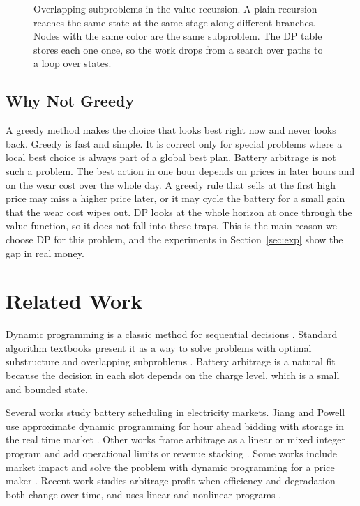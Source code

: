 \documentclass[conference,a4paper]{IEEEtran}
\begin{document}
\begin{figure}[t]
\centering

\caption{Overlapping subproblems in the value recursion. A plain recursion
reaches the same state at the same stage along different branches. Nodes with
the same color are the same subproblem. The DP table stores each one once, so
the work drops from a search over paths to a loop over states.}
\label{fig:subproblems}
\end{figure}

\subsection{Why Not Greedy}
A greedy method makes the choice that looks best right now and never looks
back. Greedy is fast and simple. It is correct only for special problems where
a local best choice is always part of a global best plan. Battery arbitrage is
not such a problem. The best action in one hour depends on prices in later
hours and on the wear cost over the whole day. A greedy rule that sells at the
first high price may miss a higher price later, or it may cycle the battery for
a small gain that the wear cost wipes out. DP looks at the whole horizon at
once through the value function, so it does not fall into these traps. This is
the main reason we choose DP for this problem, and the experiments in
Section~\ref{sec:exp} show the gap in real money.

\section{Related Work}\label{sec:related}
Dynamic programming is a classic method for sequential decisions
\cite{bellman1957}. Standard algorithm textbooks present it as a way to solve
problems with optimal substructure and overlapping subproblems
\cite{kleinberg2006}. Battery arbitrage is a natural fit because the decision
in each slot depends on the charge level, which is a small and bounded state.

Several works study battery scheduling in electricity markets. Jiang and
Powell use approximate dynamic programming for hour ahead bidding with storage
in the real time market \cite{jiang2015}. Other works frame arbitrage as a
linear or mixed integer program and add operational limits or revenue stacking
\cite{revenuestack2023}. Some works include market impact and solve the
problem with dynamic programming for a price maker \cite{energy2021}. Recent
work studies arbitrage profit when efficiency and degradation both change over
time, and uses linear and nonlinear programs \cite{jes2024}.
\end{document}
